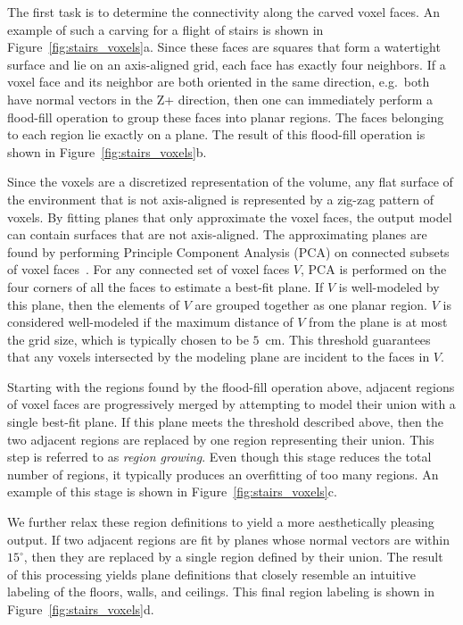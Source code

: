 \documentclass[12pt,onecolumn,oneside]{book}
\begin{document}
The first task is to determine the connectivity along the carved voxel faces. An example of such a carving for a flight of stairs is shown in Figure~\ref{fig:stairs_voxels}a.  Since these faces are squares that form a watertight surface and lie on an axis-aligned grid, each face has exactly four neighbors.  If a voxel face and its neighbor are both oriented in the same direction, e.g.\ both have normal vectors in the Z+ direction, then one can immediately perform a flood-fill operation to group these faces into planar regions.  The faces belonging to each region lie exactly on a plane.  The result of this flood-fill operation is shown in Figure~\ref{fig:stairs_voxels}b.

Since the voxels are a discretized representation of the volume, any flat surface of the environment that is not axis-aligned is represented by a zig-zag pattern of voxels.  By fitting planes that only approximate the voxel faces, the output model can contain surfaces that are not axis-aligned.  The approximating planes are found by performing Principle Component Analysis (PCA) on connected subsets of voxel faces~\cite{PCA}.  For any connected set of voxel faces $V$, PCA is performed on the four corners of all the faces to estimate a best-fit plane.  If $V$ is well-modeled by this plane, then the elements of $V$ are grouped together as one planar region.  $V$ is considered well-modeled if the maximum distance of $V$ from the plane is at most the grid size, which is typically chosen to be $5$~cm.  This threshold guarantees that any voxels intersected by the modeling plane are incident to the faces in $V$.

Starting with the regions found by the flood-fill operation above, adjacent regions of voxel faces are progressively merged by attempting to model their union with a single best-fit plane.  If this plane meets the threshold described above, then the two adjacent regions are replaced by one region representing their union.  This step is referred to as {\it region growing}.  Even though this stage reduces the total number of regions, it typically produces an overfitting of too many regions.  An example of this stage is shown in Figure~\ref{fig:stairs_voxels}c.

We further relax these region definitions to yield a more aesthetically pleasing output.  If two adjacent regions are fit by planes whose normal vectors are within $15^{\circ}$, then they are replaced by a single region defined by their union.  The result of this processing yields plane definitions that closely resemble an intuitive labeling of the floors, walls, and ceilings.  This final region labeling is shown in Figure~\ref{fig:stairs_voxels}d. 
\end{document}
